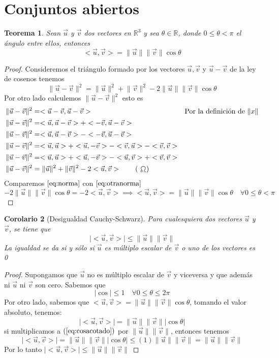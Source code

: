 \documentclass[letterpaper]{article}
\providecommand{\abs}[1]{\lvert#1\rvert}
\providecommand{\norm}[1]{\lVert#1\rVert}
\providecommand{\pint}[1]{<#1>}
\newcommand{\R}{\mathds{R}}
\renewcommand{\u}{\vec{u}}
\renewcommand{\v}{\vec{v}}
\renewcommand{\*}{\cdot}
\newtheorem{theorem}{Teorema}[section]
\newtheorem{corolario}[theorem]{Corolario}
\theoremstyle{definition}
\begin{document}
\section[Clase 23 de marzo]{Conjuntos abiertos}
\begin{theorem}
	Sean $ \vec{u} $ y $ \vec{v} $ dos vectores en $ \R^3 $ y sea $ \theta  \in \R$, donde $ 0 \leq \theta < \pi $ el ángulo entre ellos, entonces
	\[ <\vec{u}, \vec{v}> = \norm{\vec{u}}\norm{\vec{v}}\cos \theta \]
\end{theorem}
\begin{proof}
	Consideremos el triángulo formado por los vectores $ \vec{u}, \vec{v} $ y $ \vec{u} - \vec{v} $ de la ley de cosenos tenemos 
	\[ \norm{\vec{u}- \vec{v}}^2 = \norm{\vec{u}}^2 + \norm{\vec{v}}^2 - 2 \norm{\vec{u}}\norm{\vec{v}}\cos\theta \label{eq:norma} \tag{ \vernal } \]
	Por otro lado calculemos $ \norm{\vec{u} - \vec{v}}^2 $ esto es
	\begin{align*}
		\norm{\vec{u}- \vec{v}}^2 &= \pint{\u - \v, \u - \v} && \text{Por la definición de $ \norm{ x} $} \\
		\norm{\vec{u}- \vec{v}}^2 &= \pint{\u, \u - \v} + \pint{-\v, \u - \v} \\
		\norm{\vec{u}- \vec{v}}^2 &= \pint{\u, \u - \v} - \pint{-\v, \u - \v} \\
		\norm{\vec{u}- \vec{v}}^2 &= \pint{\u, \u } + \pint{\u, - \v} - \pint{\v, \u} -\pint{\v, \v} \\
		\norm{\vec{u}- \vec{v}}^2 &= \pint{\u, \u } + \pint{\u, - \v} - \pint{\u, \v} +\pint{\v, \v} \\
		\norm{\vec{u}- \vec{v}}^2 &= \norm{\u}^2 + \norm{\v}^2 - 2 \pint{\u, \v} \label{eq:otranorma} \tag{ \ascnode } \\
	\end{align*}
	Comparemos $ \ref{eq:norma} $ con $ \ref{eq:otranorma} $
	\[ -2\norm{\u}\norm{\v}\cos\theta = -2 \pint{\u, \v}  \implies \pint{\u, \v} = \norm{\u}\norm{\v}\cos\theta \quad \forall 0 \leq \theta < \pi \]
\end{proof}
\begin{corolario}[Desigualdad Cauchy-Schwarz]
	Para cualesquiera dos vectores $ \u  $ y $ \v $, se tiene que
	\[ \abs{\pint{\u, \v}} \leq \norm{\u}\norm{\v} \]
	La igualdad se da si y sólo si $ \u $ es múltiplo escalar de $ \v $ o uno de los vectores es 0
\end{corolario}
\begin{proof}
	Supongamos que $ \u $ no es múltiplo escalar  de $ \v $ y viceversa y que además ni $ \u $ ni $ \v $ son cero. Sabemos que \[ \abs{\cos} \leq 1 \quad \forall 0 \leq \theta \leq 2 \pi \label{eq:cosacotado} \tag{1} \]
	Por otro lado, sabemos que $ \pint{\u, \v} = \norm{\u}\norm{\v}\cos\theta $, tomando el valor absoluto, tenemos:
	\[ \abs{\pint{\u, \v}} = \norm{\u}\norm{\v}\abs{\cos \theta} \] si multiplicamos a $  (\ref{eq:cosacotado}) $ por $ \norm{\u}\norm{\v} $, entonces tenemos 
	\[ \abs{\pint{\u, \v}} = \norm{\u}\norm{\v}\abs{\cos \theta} \leq (1) \norm{\u}\norm{\v} = \norm{\u} \norm{\v} \]
	Por lo tanto $ \abs{\pint{\u,\v}} \leq \norm{\u}\norm{\v} $
\end{proof}
\end{document}
